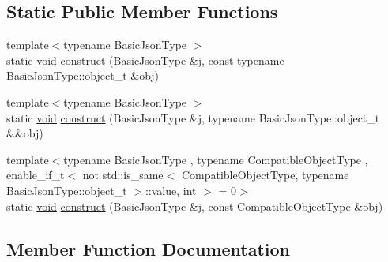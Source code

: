\subsection*{Static Public Member Functions}
\begin{DoxyCompactItemize}
\item 
{\footnotesize template$<$typename Basic\+Json\+Type $>$ }\\static \hyperlink{namespacenlohmann_1_1detail_a59fca69799f6b9e366710cb9043aa77d}{void} \hyperlink{structnlohmann_1_1detail_1_1external__constructor_3_01value__t_1_1object_01_4_a3a369c5d49596dd4411e368425f9ac7a}{construct} (Basic\+Json\+Type \&j, const typename Basic\+Json\+Type\+::object\+\_\+t \&obj)
\item 
{\footnotesize template$<$typename Basic\+Json\+Type $>$ }\\static \hyperlink{namespacenlohmann_1_1detail_a59fca69799f6b9e366710cb9043aa77d}{void} \hyperlink{structnlohmann_1_1detail_1_1external__constructor_3_01value__t_1_1object_01_4_a1e044961affbd6417386d6e9f1d545e9}{construct} (Basic\+Json\+Type \&j, typename Basic\+Json\+Type\+::object\+\_\+t \&\&obj)
\item 
{\footnotesize template$<$typename Basic\+Json\+Type , typename Compatible\+Object\+Type , enable\+\_\+if\+\_\+t$<$ not std\+::is\+\_\+same$<$ Compatible\+Object\+Type, typename Basic\+Json\+Type\+::object\+\_\+t $>$\+::value, int $>$  = 0$>$ }\\static \hyperlink{namespacenlohmann_1_1detail_a59fca69799f6b9e366710cb9043aa77d}{void} \hyperlink{structnlohmann_1_1detail_1_1external__constructor_3_01value__t_1_1object_01_4_a91f89abe0ec4dec59099b691682ff927}{construct} (Basic\+Json\+Type \&j, const Compatible\+Object\+Type \&obj)
\end{DoxyCompactItemize}


\subsection{Member Function Documentation}
\mbox{\label{structnlohmann_1_1detail_1_1external__constructor_3_01value__t_1_1object_01_4_a3a369c5d49596dd4411e368425f9ac7a}} 
